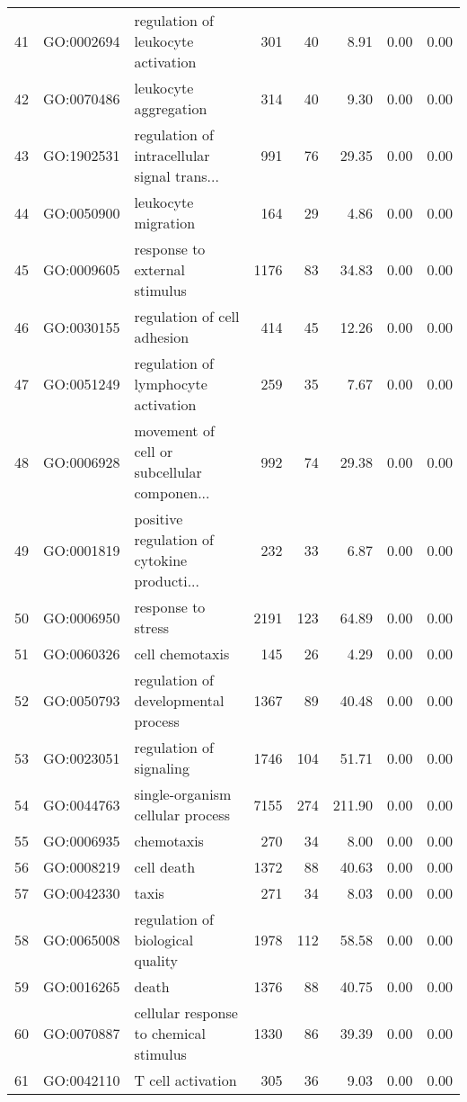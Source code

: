 \begin{table}[ht]
\begin{tabular}{rllrrrrr}
  41 & GO:0002694 & regulation of leukocyte activation & 301 &  40 & 8.91 & 0.00 & 0.00 \\ 
  42 & GO:0070486 & leukocyte aggregation & 314 &  40 & 9.30 & 0.00 & 0.00 \\ 
  43 & GO:1902531 & regulation of intracellular signal trans... & 991 &  76 & 29.35 & 0.00 & 0.00 \\ 
  44 & GO:0050900 & leukocyte migration & 164 &  29 & 4.86 & 0.00 & 0.00 \\ 
  45 & GO:0009605 & response to external stimulus & 1176 &  83 & 34.83 & 0.00 & 0.00 \\ 
  46 & GO:0030155 & regulation of cell adhesion & 414 &  45 & 12.26 & 0.00 & 0.00 \\ 
  47 & GO:0051249 & regulation of lymphocyte activation & 259 &  35 & 7.67 & 0.00 & 0.00 \\ 
  48 & GO:0006928 & movement of cell or subcellular componen... & 992 &  74 & 29.38 & 0.00 & 0.00 \\ 
  49 & GO:0001819 & positive regulation of cytokine producti... & 232 &  33 & 6.87 & 0.00 & 0.00 \\ 
  50 & GO:0006950 & response to stress & 2191 & 123 & 64.89 & 0.00 & 0.00 \\ 
  51 & GO:0060326 & cell chemotaxis & 145 &  26 & 4.29 & 0.00 & 0.00 \\ 
  52 & GO:0050793 & regulation of developmental process & 1367 &  89 & 40.48 & 0.00 & 0.00 \\ 
  53 & GO:0023051 & regulation of signaling & 1746 & 104 & 51.71 & 0.00 & 0.00 \\ 
  54 & GO:0044763 & single-organism cellular process & 7155 & 274 & 211.90 & 0.00 & 0.00 \\ 
  55 & GO:0006935 & chemotaxis & 270 &  34 & 8.00 & 0.00 & 0.00 \\ 
  56 & GO:0008219 & cell death & 1372 &  88 & 40.63 & 0.00 & 0.00 \\ 
  57 & GO:0042330 & taxis & 271 &  34 & 8.03 & 0.00 & 0.00 \\ 
  58 & GO:0065008 & regulation of biological quality & 1978 & 112 & 58.58 & 0.00 & 0.00 \\ 
  59 & GO:0016265 & death & 1376 &  88 & 40.75 & 0.00 & 0.00 \\ 
  60 & GO:0070887 & cellular response to chemical stimulus & 1330 &  86 & 39.39 & 0.00 & 0.00 \\ 
  61 & GO:0042110 & T cell activation & 305 &  36 & 9.03 & 0.00 & 0.00 \\ 

\end{tabular}
\end{table}
